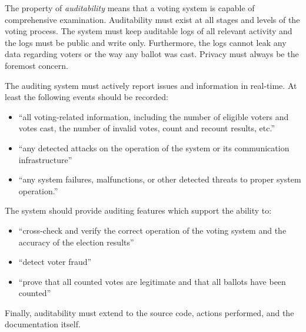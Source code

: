 The property of \emph{auditability} means that a voting system is capable of
comprehensive examination. Auditability must exist at all stages and levels of
the voting process. The system must keep auditable logs of all relevant activity
and the logs must be public and write only. Furthermore, the logs cannot leak
any data regarding voters or the way any ballot was cast. Privacy must always
be the foremost concern.

The auditing system must actively report issues and information in
real-time. At least the following events should be recorded:\cite{e2e-viv}
\begin{itemize}
  \item ``all voting-related information, including the number of eligible
    voters and votes cast, the number of invalid votes, count and recount
    results, etc.''
  \item ``any detected attacks on the operation of the system or its
    communication infrastructure''
  \item ``any system failures, malfunctions, or other detected threats to proper
    system operation.''
\end{itemize}
%
%
The system should provide auditing features which support the ability to:\cite{e2e-viv}
\begin{itemize}
  \item ``cross-check and verify the correct operation of the voting system and
    the accuracy of the election results''
  \item ``detect voter fraud''
  \item ``prove that all counted votes are legitimate and that all ballots have
    been counted''
\end{itemize}
%
%
Finally, auditability must extend to the source code, actions performed, and the
documentation itself.

